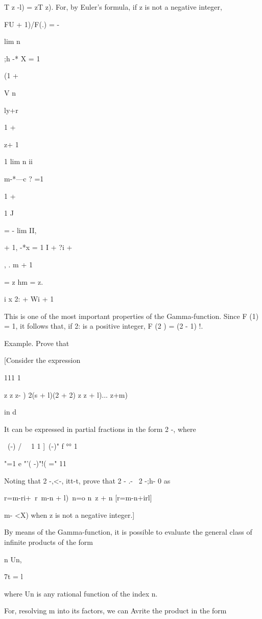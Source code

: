 T z -l) = zT z). For, by Euler's formula, if z is not a negative
integer,

FU + 1)/F(.) = -

lim n

;h -* X = 1

(1 +

V n

ly+r

1 +

z+ 1

1 lim n ii

m-*---c ? =1

1 +

1 J

= - lim II,

  + 1, -*x = 1 I + ?i +

, . m + 1

= z hm = z.

 i x 2: + Wi + 1

This is one of the most important properties of the Gamma-function.
Since F (1) = 1, it follows that, if 2: is a positive integer, F (2 )
= (2 - 1) !.

%
%

Example. Prove that

[Consider the expression

111 1

z z z- ) 2(s + l)(2 + 2) z z + l)... z+m)

in d

It can be expressed in partial fractions in the form 2 -, where

\ (-) / \ \ 1 1 ]\ (-)" f °° 1

"=1 e "'( -)"!( =" 11

Noting that 2 -,<-, itt-t, prove that 2 - .- \ 2 -;h- 0 as

r=m-ri+\ r\ m-n + l)\ n=o n\ z + n [r=m-n+irl]

m- <X) when z is not a negative integer.]


By means of the Gamma-function, it is possible to evaluate the general
class of infinite products of the form

n Un,

7t = l

where Un is any rational function of the index n.

For, resolving m into its factors, we can Avrite the product in the
form

